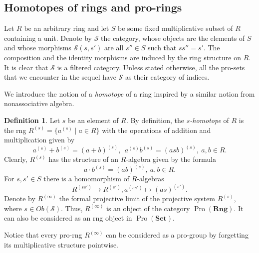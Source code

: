 \documentclass[oneside, 11pt]{amsart}
\numberwithin{equation}{section}
\theoremstyle{definition}
\newtheorem{df}[lemma]{Definition} \Crefname{df}{Definition}{Definitions}
\theoremstyle{remark}
\DeclareMathOperator{\Pro}{Pro}
\newcommand{\Set}{\mathbf{Set}}
\newcommand{\Rng}{\mathbf{Rng}}
\begin{document}
\subsection{Homotopes of rings and pro-rings} \label{sec:rng-homotopes}
Let $R$ be an arbitrary ring and let \(S\) be some fixed multiplicative subset of $R$ containing a unit. Denote by $\mathcal{S}$ the category, whose objects are the elements of \(S\) and whose morphisms \(\mathcal{S}(s, s')\) are all \(s'' \in S\) such that \(ss'' = s'\). The composition and the identity morphisms are induced by the ring structure on $R$. It is clear that $\mathcal{S}$ is a filtered category. Unless stated otherwise, all the pro-sets that we encounter in the sequel have \(\mathcal S\) as their category of indices.

We introduce the notion of a {\it homotope} of a ring inspired by a similar notion from nonassociative algebra.
\begin{df} \label{ring-homotope}
 Let $s$ be an element of $R$.  
 By definition, the {\it \(s\)-homotope} of \(R\) is the rng \(R^{(s)} = \{a^{(s)} \mid a \in R\}\) with the operations of addition and multiplication given by
 \[ a^{(s)} + b^{(s)} = (a + b)^{(s)},\ \ a^{(s)} b^{(s)} = (asb)^{(s)},\ a, b\in R.\]
 Clearly, $R^{(s)}$ has the structure of an \(R\)-algebra given by the formula \[a \cdot b^{(s)} = (ab)^{(s)},\ a, b \in R.\] For \(s, s' \in S\) there is a homomorphism of \(R\)-algebras \[R^{(ss')} \to R^{(s')}, a^{(ss')} \mapsto (as)^{(s')}.\]
 Denote by \(R^{(\infty)}\) the formal projective limit of the projective system \(R^{(s)}\), where \(s \in Ob(\mathcal S)\).
 Thus, $R^{(\infty)}$ is an object of the category $\Pro(\Rng)$. 
 It can also be considered as an rng object in \(\Pro(\Set)\).  
\end{df}

Notice that every pro-rng $R^{(\infty)}$ can be considered as a pro-group by forgetting its multiplicative structure pointwise.
\end{document}

